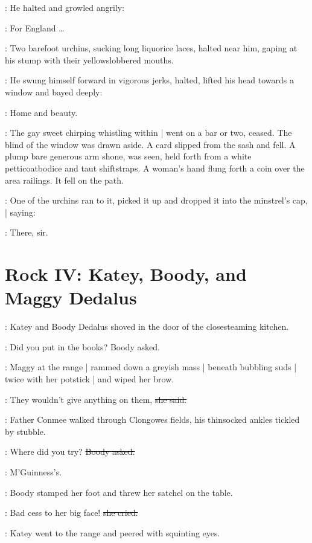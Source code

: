 :
He halted and growled angrily:

\sailor:
For England \ldots

:
Two barefoot urchins,
sucking long liquorice laces,
halted near him,
gaping at his stump with their yellowslobbered mouths.

:
He swung himself forward in vigorous jerks,
halted,
lifted his head towards a window
and bayed deeply:

\sailor:
Home and beauty.

:
The gay sweet chirping whistling within |
went on a bar or two, ceased.
The blind of the window was drawn aside.%
A card 
slipped from the sash and fell.
A plump bare generous arm shone,
was seen,
held forth from a white petticoatbodice and taut shiftstraps.
A woman's hand flung forth a coin
over the area railings.
It fell on the path.

:
One of the urchins ran to it,
picked it up and dropped it into the minstrel's cap, |
saying:

\boy:
There, sir.


\section*{Rock IV: Katey, Boody, and Maggy Dedalus}

:
Katey and Boody Dedalus shoved in the door
of the closesteaming kitchen.

\boody:
Did you put in the books?%
Boody asked.

:
Maggy at the range |
rammed down a greyish mass |
beneath bubbling suds |
twice with her potstick |
and wiped her brow.

\maggy:
They wouldn't give anything on them,
\sout{she said.}

\begin{interject}
    :
    Father Conmee walked through Clongowes fields,
    his thinsocked ankles tickled by stubble.
\end{interject}

\boody:
Where did you try?
\sout{Boody asked.}

\maggy:
M'Guinness's.

:
Boody stamped her foot and threw her satchel on the table.

\boody:
Bad cess to her big face!
\sout{she cried.}

:
Katey went to the range%
and peered with squinting eyes.

